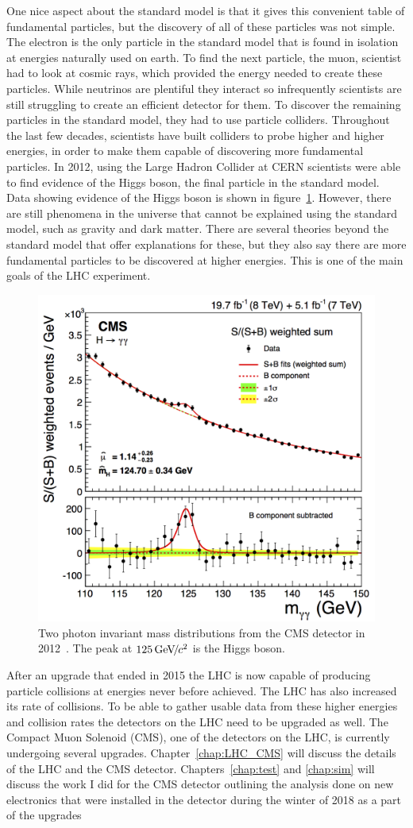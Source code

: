 One nice aspect about the standard model is that it gives this convenient table of fundamental particles, but the discovery of all of these particles was not simple. The electron is the only particle in the standard model that is found in isolation at energies naturally used on earth. To find the next particle, the muon, scientist had to look at cosmic rays, which provided the energy needed to create these particles. While neutrinos are plentiful they interact so infrequently scientists are still struggling to create an efficient detector for them. To discover the remaining particles in the standard model, they had to use particle colliders. Throughout the last few decades, scientists have built colliders to probe higher and higher energies, in order to make them capable of discovering more fundamental particles. In 2012, using the Large Hadron Collider at CERN scientists were able to find evidence of the Higgs boson, the final particle in the standard model. Data showing evidence of the Higgs boson is shown in figure~\ref{fig:higgs}. However, there are still phenomena in the universe that cannot be explained using the standard model, such as gravity and dark matter. There are several theories beyond the standard model that offer explanations for these, but they also say there are more fundamental particles to be discovered at higher energies. This is one of the main goals of the LHC experiment. 

\begin{figure}
\centering
\includegraphics[width=0.6\linewidth]{Figures/higgsmeasurement.png}
\caption{Two photon invariant mass distributions from the CMS detector in 2012~\cite{CMS_Higgs_Discovery}. The peak at $125{\,\text{Ge\hspace{-.08em}V\hspace{-0.16em}/\hspace{-0.08em}}c^\text{2}}$ is the Higgs boson.}
\label{fig:higgs}
\end{figure} 


After an upgrade that ended in 2015 the LHC is now capable of producing particle collisions at energies never before achieved. The LHC has also increased its rate of collisions. To be able to gather usable data from these higher energies and collision rates the detectors on the LHC need to be upgraded as well. The Compact Muon Solenoid (CMS), one of the detectors on the LHC, is currently undergoing several upgrades. Chapter~\ref{chap:LHC_CMS} will discuss the details of the LHC and the CMS detector. Chapters~\ref{chap:test} and \ref{chap:sim} will discuss the work I did for the CMS detector outlining the analysis done on new electronics that were installed in the detector during the winter of 2018 as a part of the upgrades

